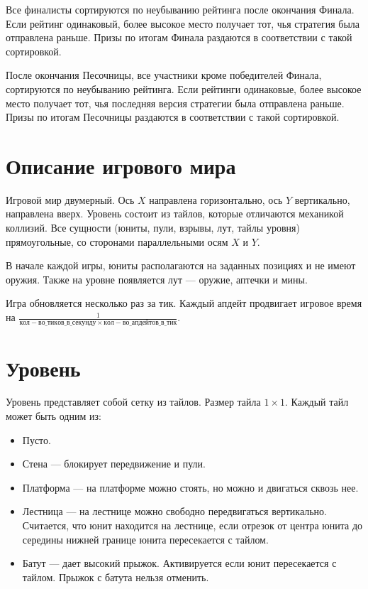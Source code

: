 Все финалисты сортируются по неубыванию рейтинга после окончания Финала. Если рейтинг одинаковый, более высокое место получает тот, чья стратегия была отправлена раньше.
Призы по итогам Финала раздаются в соответствии с такой сортировкой.

После окончания Песочницы, все участники кроме победителей Финала, сортируются по неубыванию рейтинга. Если рейтинги одинаковые,
более высокое место получает тот, чья последняя версия стратегии была отправлена раньше. Призы по итогам Песочницы раздаются в соответствии с такой сортировкой.

\section{Описание игрового мира}

Игровой мир двумерный.
Ось $X$ направлена горизонтально, ось $Y$ вертикально, направлена вверх.
Уровень состоит из тайлов, которые отличаются механикой коллизий.
Все сущности (юниты, пули, взрывы, лут, тайлы уровня) прямоугольные, со сторонами параллельными осям $X$ и $Y$.

В начале каждой игры, юниты располагаются на заданных позициях и не имеют оружия.
Также на уровне появляется лут --- оружие, аптечки и мины.

Игра обновляется несколько раз за тик.
Каждый апдейт продвигает игровое время на $\frac{1}{кол-во\_тиков\_в\_секунду \times кол-во\_апдейтов\_в\_тик}$.

\section{Уровень}

Уровень представляет собой сетку из тайлов. Размер тайла $1 \times 1$. Каждый тайл может быть одним из:
\begin{itemize}
      \item Пусто.
      \item Стена --- блокирует передвижение и пули.
      \item Платформа --- на платформе можно стоять, но можно и двигаться сквозь нее.
      \item Лестница --- на лестнице можно свободно передвигаться вертикально.
            Считается, что юнит находится на лестнице, если отрезок от центра юнита до середины нижней границе юнита пересекается с тайлом.
      \item Батут --- дает высокий прыжок. Активируется если юнит пересекается с тайлом.
            Прыжок с батута нельзя отменить.
\end{itemize}

